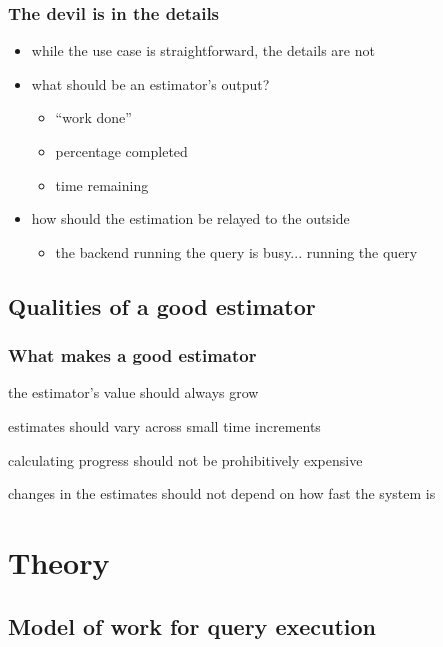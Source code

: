\documentclass{beamer}
\begin{document}
\begin{frame}
  \frametitle{The devil is in the details}

  \begin{itemize}
  \item while the use case is straightforward, the details are not
  \item what should be an estimator's output?
    \begin{itemize}
    \item ``work done''
    \item percentage completed
    \item time remaining
    \end{itemize}
  \item how should the estimation be relayed to the outside
    \begin{itemize}
    \item the backend running the query is busy... running the query
    \end{itemize}
  \end{itemize}
\end{frame}

\subsection{Qualities of a good estimator}

\begin{frame}
  \frametitle{What makes a good estimator}

  \begin{description}
  \item[monotonicity] the estimator's value should always grow
  \item[granularity] estimates should vary across small time increments
  \item[low overhead] calculating progress should not be prohibitively
    expensive
  \item[hardware independence] changes in the estimates should not depend on
    how fast the system is
  \end{description}
\end{frame}

\section{Theory}
\subsection{Model of work for query execution}
\end{document}
